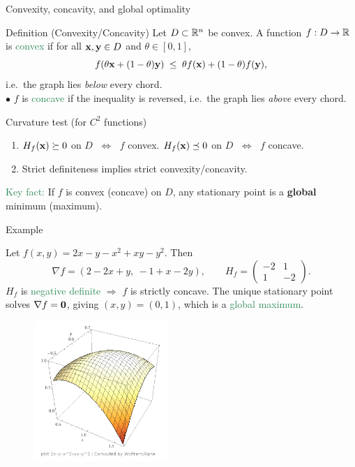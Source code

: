 \documentclass[11pt,aspectratio=169]{beamer}
\begin{document}
\begin{frame}{Convexity, concavity, and global optimality}

\begin{alertblock}{Definition (Convexity/Concavity)}
Let \(D \subset \mathbb R^n\) be convex.  
A function \(f:D\to\mathbb R\) is \textcolor{SeaGreen}{convex} if for all \({\bf x},{\bf y}\in D\) and \(\theta\in[0,1]\),
\[
f(\theta{\bf x}+(1-\theta){\bf y}) 
\;\leq\; \theta f({\bf x})+(1-\theta)f({\bf y}),
\]
i.e.\ the graph lies \emph{below} every chord.\\[2mm]
$\bullet$  $f$ is \textcolor{SeaGreen}{concave} if the inequality is reversed,
i.e.\ the graph lies \emph{above} every chord.
\end{alertblock}

\medskip
\begin{block}{Curvature test (for \(C^2\) functions)}
\begin{enumerate}
\item \(H_f({\bf x})\succeq 0\) on \(D\) \(\;\Leftrightarrow\;\) \(f\) convex.  
      \(H_f({\bf x})\preceq 0\) on \(D\) \(\;\Leftrightarrow\;\) \(f\) concave.
\item Strict definiteness implies strict convexity/concavity.
\end{enumerate}
\end{block}

\medskip
\textcolor{SeaGreen}{Key fact:} If \(f\) is convex (concave) on \(D\), any stationary point is a \textbf{global} minimum (maximum).

\end{frame}

\begin{frame}{Example}

Let \(f(x,y)=2x-y-x^2+xy-y^2\). Then
\[
\nabla f=(2-2x+y,\ -1+x-2y),\qquad
H_f=\begin{pmatrix}-2&1\\[2pt]1&-2\end{pmatrix}.
\]
\(H_f\) is \textcolor{SeaGreen}{negative definite} \(\Rightarrow\) \(f\) is strictly concave. The unique stationary point solves \(\nabla f={\bf 0}\), giving \((x,y)=(0,1)\), which is a \textcolor{SeaGreen}{global maximum}.

\begin{figure}
\includegraphics[width=2in]{img/plotxy}
\end{figure}
\end{frame}
\end{document}
